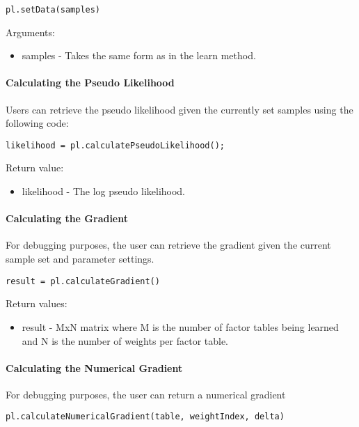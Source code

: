 \begin{lstlisting}
pl.setData(samples)
\end{lstlisting}

Arguments:
\begin{itemize}
\item samples - Takes the same form as in the learn method.
\end{itemize}

\paragraph{Calculating the Pseudo Likelihood}
Users can retrieve the pseudo likelihood given the currently set samples using the following code:

\begin{lstlisting}
likelihood = pl.calculatePseudoLikelihood();
\end{lstlisting}

Return value:
\begin{itemize}
\item likelihood - The log pseudo likelihood.
\end{itemize}

\paragraph{Calculating the Gradient}
For debugging purposes, the user can retrieve the gradient given the current sample set and parameter settings.

\begin{lstlisting}
result = pl.calculateGradient()
\end{lstlisting}

Return values:
\begin{itemize}
\item result - MxN matrix where M is the number of factor tables being learned and N is the number of weights per factor table.
\end{itemize}

\paragraph{Calculating the Numerical Gradient}
For debugging purposes, the user can return a numerical gradient

\begin{lstlisting}
pl.calculateNumericalGradient(table, weightIndex, delta)
\end{lstlisting}


